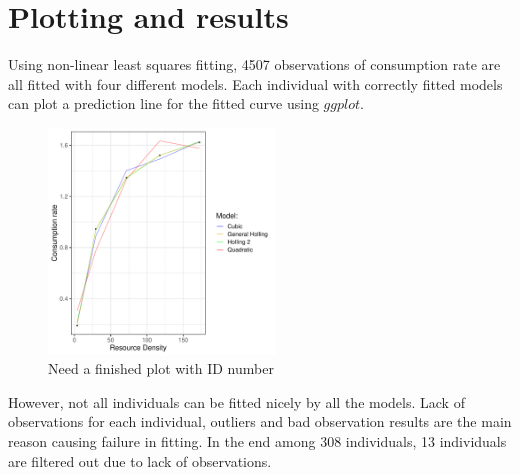 \documentclass{article}[11pt,a4,twosided,doublespacing,titlepagenumber=on,numbers=endperiod]
\begin{document}
\newpage

\section{Plotting and results}
Using non-linear least squares fitting, 4507 observations of consumption rate are all fitted with four different models. Each individual with correctly fitted models can plot a prediction line for the fitted curve using $ggplot$.
\begin{figure}[H]
\centering
\includegraphics[height= 60mm]{../Results/plot/Functional_response_curve_40130.pdf}
\renewcommand\thefigure{\arabic{figure}}
\setcounter{figure}{0}
\caption{Need a finished plot with ID number}
\end{figure}
\noindent However, not all individuals can be fitted nicely by all the models. Lack of observations for each individual, outliers and bad observation results are the main reason causing failure in fitting. In the end  among 308 individuals, 13 individuals are filtered out due to lack of observations. 
\end{document}
